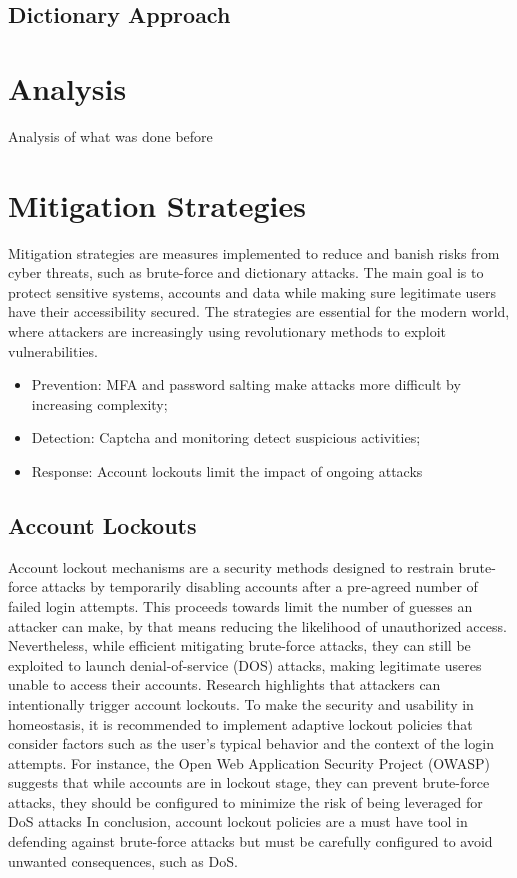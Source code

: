 \documentclass{comjnl}
\begin{document}
\subsection{Dictionary Approach}

\section{Analysis}

Analysis of what was done before

\section{Mitigation Strategies}
Mitigation strategies are measures implemented to reduce and banish risks from cyber threats, such as brute-force and dictionary attacks. The main goal is to protect sensitive systems, accounts and data while making sure legitimate users have their accessibility secured. The strategies are essential for the modern world, where attackers are increasingly using revolutionary methods to exploit vulnerabilities.


\begin{itemize}
  \item Prevention: MFA and password salting make attacks more difficult by increasing complexity;
  \item Detection: Captcha and monitoring detect suspicious activities;
  \item Response: Account lockouts limit the impact of ongoing attacks
\end{itemize}

\subsection{Account Lockouts}
Account lockout mechanisms are a security methods designed to restrain brute-force attacks by temporarily disabling accounts after a pre-agreed number of failed login attempts. This proceeds towards limit the number of guesses an attacker can make, by that means reducing the likelihood of unauthorized access. Nevertheless, while efficient mitigating brute-force attacks, they can still be exploited to launch denial-of-service (DOS) attacks, making legitimate useres unable to access their accounts. Research highlights that attackers can intentionally trigger account lockouts.\cite{account_lockout_dos} To make the security and usability in homeostasis, it is recommended to implement adaptive lockout policies that consider factors such as the user's typical behavior and the context of the login attempts. For instance, the Open Web Application Security Project (OWASP) suggests that while accounts are in lockout stage, they can prevent brute-force attacks, they should be configured to minimize the risk of being leveraged for DoS attacks \cite{blocking_brute_force} In conclusion, account lockout policies are a must have tool in defending against brute-force attacks but must be carefully configured to avoid unwanted consequences, such as DoS.
\end{document}
